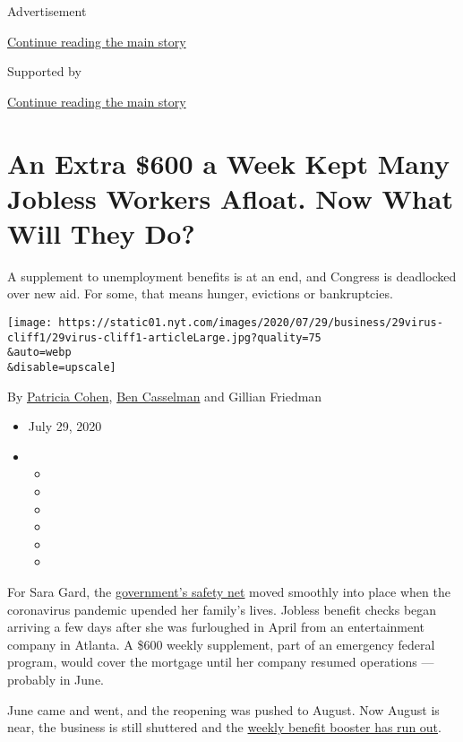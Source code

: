 Advertisement

\protect\hyperlink{after-top}{Continue reading the main story}

Supported by

\protect\hyperlink{after-sponsor}{Continue reading the main story}

\hypertarget{an-extra-600-a-week-kept-many-jobless-workers-afloat-now-what-will-they-do}{%
\section{An Extra \$600 a Week Kept Many Jobless Workers Afloat. Now
What Will They
Do?}\label{an-extra-600-a-week-kept-many-jobless-workers-afloat-now-what-will-they-do}}

A supplement to unemployment benefits is at an end, and Congress is
deadlocked over new aid. For some, that means hunger, evictions or
bankruptcies.

\texttt{[image: https://static01.nyt.com/images/2020/07/29/business/29virus-cliff1/29virus-cliff1-articleLarge.jpg?quality=75\\\&auto=webp\\\&disable=upscale]}

By \href{https://www.nytimes.com/by/patricia-cohen}{Patricia Cohen},
\href{https://www.nytimes.com/by/ben-casselman}{Ben Casselman} and
Gillian Friedman

\begin{itemize}
\item
  July 29, 2020
\item
  \begin{itemize}
  \item
  \item
  \item
  \item
  \item
  \item
  \end{itemize}
\end{itemize}

For Sara Gard, the
\href{https://www.nytimes.com/article/coronavirus-stimulus-package-questions-answers.html}{government's
safety net} moved smoothly into place when the coronavirus pandemic
upended her family's lives. Jobless benefit checks began arriving a few
days after she was furloughed in April from an entertainment company in
Atlanta. A \$600 weekly supplement, part of an emergency federal
program, would cover the mortgage until her company resumed operations
--- probably in June.

June came and went, and the reopening was pushed to August. Now August
is near, the business is still shuttered and the
\href{https://www.nytimes.com/2020/07/21/business/economy/coronavirus-unemployment-benefits.html}{weekly
benefit booster has run out}.

